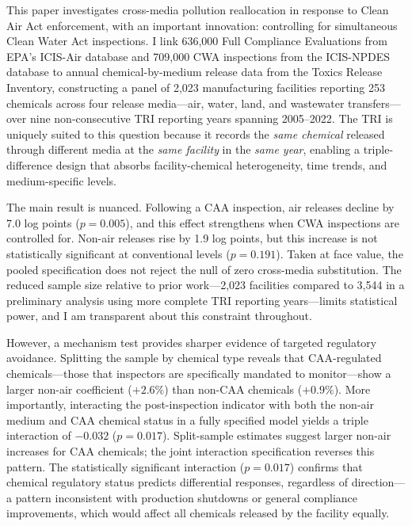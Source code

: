 \documentclass[12pt]{article}
\begin{document}
This paper investigates cross-media pollution reallocation in response to Clean Air Act enforcement, with an important innovation: controlling for simultaneous Clean Water Act inspections. I link 636,000 Full Compliance Evaluations from EPA's ICIS-Air database and 709,000 CWA inspections from the ICIS-NPDES database to annual chemical-by-medium release data from the Toxics Release Inventory, constructing a panel of 2,023 manufacturing facilities reporting 253 chemicals across four release media---air, water, land, and wastewater transfers---over nine non-consecutive TRI reporting years spanning 2005--2022. The TRI is uniquely suited to this question because it records the \textit{same chemical} released through different media at the \textit{same facility} in the \textit{same year}, enabling a triple-difference design that absorbs facility-chemical heterogeneity, time trends, and medium-specific levels.

The main result is nuanced. Following a CAA inspection, air releases decline by 7.0 log points ($p = 0.005$), and this effect strengthens when CWA inspections are controlled for. Non-air releases rise by 1.9 log points, but this increase is not statistically significant at conventional levels ($p = 0.191$). Taken at face value, the pooled specification does not reject the null of zero cross-media substitution. The reduced sample size relative to prior work---2,023 facilities compared to 3,544 in a preliminary analysis using more complete TRI reporting years---limits statistical power, and I am transparent about this constraint throughout.

However, a mechanism test provides sharper evidence of targeted regulatory avoidance. Splitting the sample by chemical type reveals that CAA-regulated chemicals---those that inspectors are specifically mandated to monitor---show a larger non-air coefficient ($+2.6\%$) than non-CAA chemicals ($+0.9\%$). More importantly, interacting the post-inspection indicator with both the non-air medium and CAA chemical status in a fully specified model yields a triple interaction of $-0.032$ ($p = 0.017$). Split-sample estimates suggest larger non-air increases for CAA chemicals; the joint interaction specification reverses this pattern. The statistically significant interaction ($p = 0.017$) confirms that chemical regulatory status predicts differential responses, regardless of direction---a pattern inconsistent with production shutdowns or general compliance improvements, which would affect all chemicals released by the facility equally.
\end{document}
